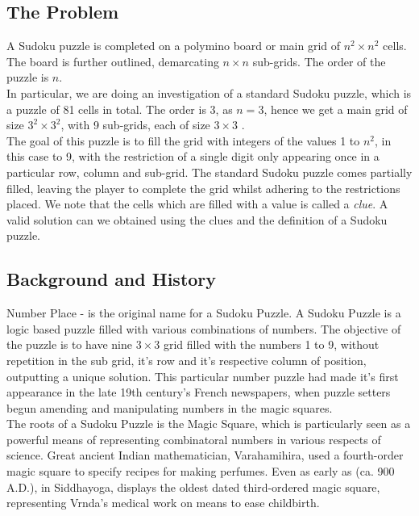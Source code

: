 \documentclass[12pt]{article}
\begin{document}
\subsection{The Problem}
A Sudoku puzzle is completed on a polymino board or main grid of $ n^2 \times n^2$ cells. The board is further outlined, demarcating $n \times n $ sub-grids. The order of the puzzle is $n$. \\
In particular, we are doing an investigation of a standard Sudoku puzzle, which is a puzzle of 81 cells in total. The order is 3, as $n = 3$, hence we get a main grid of size $3^2\times 3^2$, with 9 sub-grids, each of size $ 3\times 3 $ .\\
The goal of this puzzle is to fill the grid with integers of the values 1 to $n^2$, in this case to 9, with the restriction of a single digit only appearing once in a particular row, column and sub-grid. The standard Sudoku puzzle comes partially filled, leaving the player to complete the grid whilst adhering to the restrictions placed. We note that the cells which are  filled with a value is called a \textsl{clue}. A valid solution can we obtained using the clues and the definition of a Sudoku puzzle.  

\subsection{Background and History}
\begin{flushleft}
Number Place - is the original name for a Sudoku Puzzle.
A Sudoku Puzzle is a logic based puzzle filled with various combinations of numbers. The objective of the puzzle is to have nine $3\times3$ grid filled with the numbers 1 to 9, without repetition in the sub grid, it's row and it's respective column of position, outputting a unique solution. This particular number puzzle had made it's first appearance in the late 19th century's French newspapers, when puzzle setters begun amending and manipulating numbers in the magic squares. 
\\
The roots of a Sudoku Puzzle is the Magic Square, which is particularly seen as a powerful means of representing combinatoral numbers in various respects of science. Great ancient Indian mathematician, Varahamihira, used a fourth-order magic square to specify recipes for making perfumes. Even as early as (ca. 900 A.D.), in Siddhayoga, displays the oldest dated third-ordered magic square, representing Vrnda's medical work on means to ease childbirth.
\end{flushleft}
\end{document}
